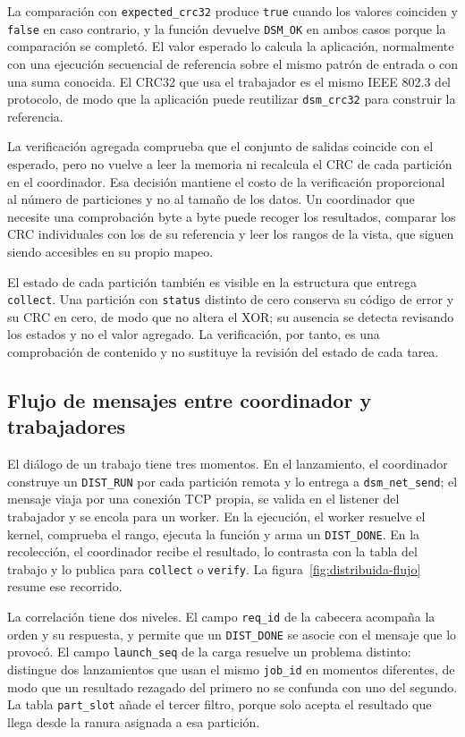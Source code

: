 La comparación con \texttt{expected\_crc32} produce \texttt{true} cuando los valores coinciden y \texttt{false} en caso contrario, y la función devuelve \texttt{DSM\_OK} en ambos casos porque la comparación se completó. El valor esperado lo calcula la aplicación, normalmente con una ejecución secuencial de referencia sobre el mismo patrón de entrada o con una suma conocida. El CRC32 que usa el trabajador es el mismo IEEE 802.3 del protocolo, de modo que la aplicación puede reutilizar \texttt{dsm\_crc32} para construir la referencia.

La verificación agregada comprueba que el conjunto de salidas coincide con el esperado, pero no vuelve a leer la memoria ni recalcula el CRC de cada partición en el coordinador. Esa decisión mantiene el costo de la verificación proporcional al número de particiones y no al tamaño de los datos. Un coordinador que necesite una comprobación byte a byte puede recoger los resultados, comparar los CRC individuales con los de su referencia y leer los rangos de la vista, que siguen siendo accesibles en su propio mapeo.

El estado de cada partición también es visible en la estructura que entrega \texttt{collect}. Una partición con \texttt{status} distinto de cero conserva su código de error y su CRC en cero, de modo que no altera el XOR; su ausencia se detecta revisando los estados y no el valor agregado. La verificación, por tanto, es una comprobación de contenido y no sustituye la revisión del estado de cada tarea.

\subsection{Flujo de mensajes entre coordinador y trabajadores}

El diálogo de un trabajo tiene tres momentos. En el lanzamiento, el coordinador construye un \texttt{DIST\_RUN} por cada partición remota y lo entrega a \texttt{dsm\_net\_send}; el mensaje viaja por una conexión TCP propia, se valida en el listener del trabajador y se encola para un worker. En la ejecución, el worker resuelve el kernel, comprueba el rango, ejecuta la función y arma un \texttt{DIST\_DONE}. En la recolección, el coordinador recibe el resultado, lo contrasta con la tabla del trabajo y lo publica para \texttt{collect} o \texttt{verify}. La figura~\ref{fig:distribuida-flujo} resume ese recorrido.

La correlación tiene dos niveles. El campo \texttt{req\_id} de la cabecera acompaña la orden y su respuesta, y permite que un \texttt{DIST\_DONE} se asocie con el mensaje que lo provocó. El campo \texttt{launch\_seq} de la carga resuelve un problema distinto: distingue dos lanzamientos que usan el mismo \texttt{job\_id} en momentos diferentes, de modo que un resultado rezagado del primero no se confunda con uno del segundo. La tabla \texttt{part\_slot} añade el tercer filtro, porque solo acepta el resultado que llega desde la ranura asignada a esa partición.

